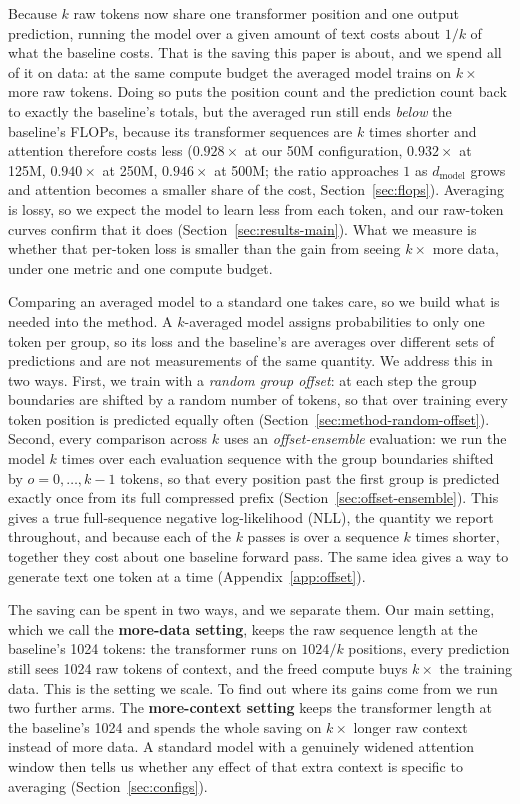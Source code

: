 \documentclass[11pt]{article}
\newcommand{\dmodel}{d_{\mathrm{model}}}
\begin{document}
Because $k$ raw tokens now share one transformer position and one output
prediction, running the model over a given amount of text costs about $1/k$
of what the baseline costs. That is the saving this paper is about, and we
spend all of it on data: at the same compute budget the averaged model
trains on $k\times$ more raw tokens. Doing so puts the position count and
the prediction count back to exactly the baseline's totals, but the averaged
run still ends \emph{below} the baseline's FLOPs, because its transformer
sequences are $k$ times shorter and attention therefore costs less
($0.928\times$ at our 50M configuration, $0.932\times$ at 125M,
$0.940\times$ at 250M, $0.946\times$ at 500M; the ratio approaches $1$ as
$\dmodel$ grows and attention becomes a smaller share of the cost,
Section~\ref{sec:flops}). Averaging is lossy, so we expect the model to learn
less from each token, and our raw-token curves confirm that it does
(Section~\ref{sec:results-main}). What we measure is whether that per-token
loss is smaller than the gain from seeing $k\times$ more data, under one
metric and one compute budget.

Comparing an averaged model to a standard one takes care, so we build what
is needed into the method. A $k$-averaged model assigns probabilities to
only one token per group, so its loss and the baseline's are averages over
different sets of predictions and are not measurements of the same quantity.
We address this in two ways. First, we train with a \emph{random group
offset}: at each step the group boundaries are shifted by a random number of
tokens, so that over training every token position is predicted equally
often (Section~\ref{sec:method-random-offset}). Second, every comparison
across $k$ uses an \emph{offset-ensemble} evaluation: we run the model $k$
times over each evaluation sequence with the group boundaries shifted by
$o = 0, \dots, k{-}1$ tokens, so that every position past the first group is
predicted exactly once from its full compressed prefix
(Section~\ref{sec:offset-ensemble}). This gives a true full-sequence
negative log-likelihood (NLL), the quantity we report throughout, and because
each of the $k$ passes is over a sequence $k$ times shorter, together they
cost about one baseline forward pass. The same idea gives a way to generate text one token at a time
(Appendix~\ref{app:offset}).

The saving can be spent in two ways, and we separate them. Our main setting,
which we call the \textbf{more-data setting}, keeps the raw sequence length
at the baseline's 1024 tokens: the transformer runs on $1024/k$ positions,
every prediction still sees 1024 raw tokens of context, and the freed
compute buys $k\times$ the training data. This is the setting we scale. To
find out where its gains come from we run two further arms. The
\textbf{more-context setting} keeps the transformer length at the baseline's
1024 and spends the whole saving on $k\times$ longer raw context instead of
more data. A standard model with a genuinely widened attention window then
tells us whether any effect of that extra context is specific to averaging
(Section~\ref{sec:configs}).
\end{document}
